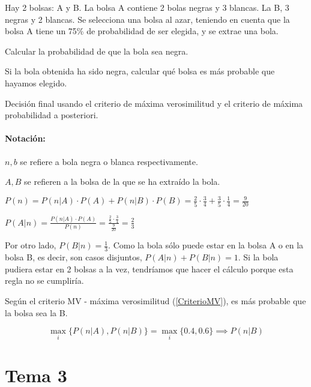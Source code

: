 \begin{problem}[5]
Hay 2 bolsas: A y B. La bolsa A contiene 2 bolas negras y 3 blancas. La B, 3 negras y 2 blancas. Se selecciona una bolsa al azar, teniendo en cuenta que la bolsa A tiene un 75\% de probabilidad de ser elegida, y se extrae una bola.

\ppart Calcular la probabilidad de que la bola sea negra.

\ppart Si la bola obtenida ha sido negra, calcular qué bolsa es más probable que hayamos elegido.

\ppart Decisión final usando el criterio de máxima verosimilitud y el criterio de máxima probabilidad a posteriori.


\solution
\paragraph{Notación:\\} 
$n,b$ se refiere a bola negra o blanca respectivamente.

$A,B$ se refieren a la bolsa de la que se ha extraído la bola.

\spart $P(n) = P(n | A)·P(A) + P(n|B)·P(B) = \frac{2}{5}·\frac{3}{4} + \frac{3}{5} · \frac{1}{4} = \frac{9}{20}$

\spart $P(A|n) = \frac{P(n|A)·P(A)}{P(n)} = \frac{\frac{2}{5}·\frac{3}{4}}{\frac{9}{20}} = \frac{2}{3}$

Por otro lado, $P(B|n) = \frac{1}{3}$. Como la bola sólo puede estar en la bolsa A o en la bolsa B, es decir, son casos disjuntos, $P(A|n) + P(B|n) = 1$. Si la bola pudiera estar en 2 bolsas a la vez, tendríamos que hacer el cálculo porque esta regla no se cumpliría.

\spart

Según el criterio MV - máxima verosimilitud (\ref{CriterioMV}), es más probable que la bolsa sea la B.

\[
\max_i\{P(n|A),P(n|B)\} = \max_i\{0.4,0.6\}\implies P(n|B)
\]

\end{problem}


\setcounter{section}{2}
\section{Tema 3}

